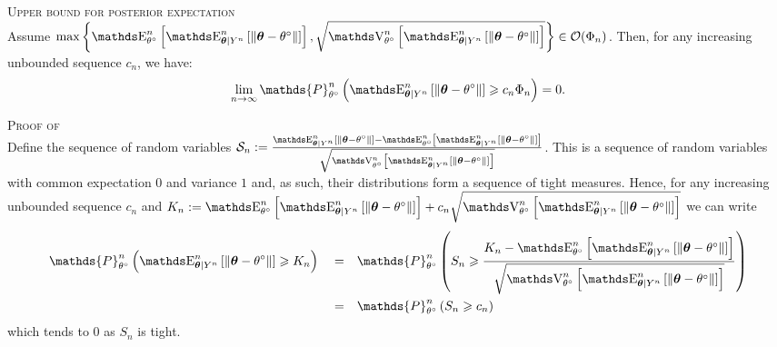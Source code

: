 \begin{lm}\label{LM_BAYES_STRATEGIES_UPPEREXPEC}{\textsc{Upper bound for posterior expectation}\\}
Assume $\max\left\{ \E^{n}_{\theta^{\circ}}\left[\E^{n}_{\boldsymbol{\theta} \vert Y^{n}}\left[\Vert \boldsymbol{\theta} - \theta^{\circ} \Vert\right]\right], \sqrt{\V^{n}_{\theta^{\circ}}\left[ \E^{n}_{\boldsymbol{\theta} \vert Y^{n}}\left[\Vert \boldsymbol{\theta} - \theta^{\circ} \Vert\right]\right]} \right\} \in \mathcal{O}(\Phi_{n})$.
Then, for any increasing unbounded sequence $c_{n}$, we have:
\[\lim\limits_{n \rightarrow \infty} \mathds{P}_{\theta^{\circ}}^{n}\left(\E_{\boldsymbol{\theta} \vert Y^{n}}^{n}\left[\Vert \boldsymbol{\theta} - \theta^{\circ} \Vert \right] \geq c_{n}\Phi_{n}\right) = 0.\]
\end{lm}

\begin{pro}\label{PRO_BAYES_STRATEGIES_UPPEREXPEC}{\textsc{Proof of }\\}
Define the sequence of random variables $\mathcal{S}_{n} := \frac{\E_{\boldsymbol{\theta} \vert Y^{n}}^{n}\left[\Vert \boldsymbol{\theta} - \theta^{\circ} \Vert \right] - \E^{n}_{\theta^{\circ}}\left[\E_{\boldsymbol{\theta} \vert Y^{n}}^{n}\left[\Vert \boldsymbol{\theta} - \theta^{\circ} \Vert \right]\right]}{\sqrt{\V^{n}_{\theta^{\circ}}\left[\E_{\boldsymbol{\theta} \vert Y^{n}}^{n}\left[\Vert \boldsymbol{\theta} - \theta^{\circ} \Vert \right]\right]}}$.
This is a sequence of random variables with common expectation $0$ and variance $1$ and, as such, their distributions form a sequence of tight measures.
Hence, for any increasing unbounded sequence $c_{n}$ and $K_{n} := \E^{n}_{\theta^{\circ}}\left[\E_{\boldsymbol{\theta} \vert Y^{n}}^{n}\left[\Vert \boldsymbol{\theta} - \theta^{\circ} \Vert \right]\right] + c_{n} \sqrt{\V^{n}_{\theta^{\circ}}\left[\E_{\boldsymbol{\theta} \vert Y^{n}}^{n}\left[\Vert \boldsymbol{\theta} - \theta^{\circ} \Vert \right]\right]}$ we can write
\begin{alignat*}{3}
& \mathds{P}_{\theta^{\circ}}^{n}\left(\E_{\boldsymbol{\theta} \vert Y^{n}}^{n}\left[\Vert \boldsymbol{\theta} - \theta^{\circ} \Vert \right] \geq K_{n}\right) && = && \mathds{P}_{\theta^{\circ}}^{n}\left(S_{n} \geq \frac{K_{n} - \E^{n}_{\theta^{\circ}}\left[\E_{\boldsymbol{\theta} \vert Y^{n}}^{n}\left[\Vert \boldsymbol{\theta} - \theta^{\circ} \Vert \right]\right]}{\sqrt{\V^{n}_{\theta^{\circ}}\left[\E_{\boldsymbol{\theta} \vert Y^{n}}^{n}\left[\Vert \boldsymbol{\theta} - \theta^{\circ} \Vert \right]\right]}}\right)\\
& &&=&& \mathds{P}_{\theta^{\circ}}^{n}\left(S_{n} \geq c_{n}\right)
\end{alignat*}
which tends to $0$ as $S_{n}$ is tight.
\qedsymbol
\end{pro}


